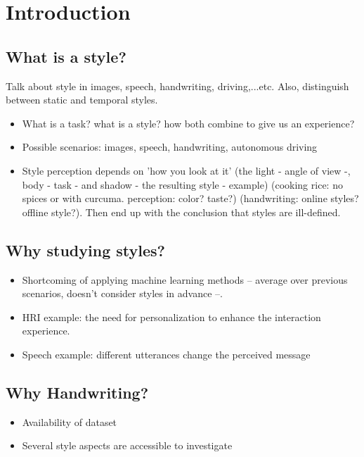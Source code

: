 \chapter{Introduction}
\minitoc%

\section{What is a style?}\label{sec:style}
Talk about style in images, speech, handwriting, driving,...etc. Also, distinguish between static and temporal styles.
\begin{itemize}[noitemsep]
    \item What is a task? what is a style? how both combine to give us an experience?
    \item Possible scenarios: images, speech, handwriting, autonomous driving
    \item Style perception depends on 'how you look at it' (the light - angle of view -, body - task - and shadow - the resulting style - example) (cooking rice: no spices or with curcuma. perception: color? taste?) (handwriting: online styles? offline style?). Then end up with the conclusion that styles are ill-defined.
\end{itemize}

\section{Why studying styles?}
\begin{itemize}[noitemsep]
    \item Shortcoming of applying machine learning methods -- average over previous scenarios, doesn't consider styles in advance --.
    \item HRI example: the need for personalization to enhance the interaction experience.
    \item Speech example: different utterances change the perceived message
\end{itemize}

\section{Why Handwriting?}
\begin{itemize}[noitemsep]
    \item Availability of dataset
    \item Several style aspects are accessible to investigate
\end{itemize}

